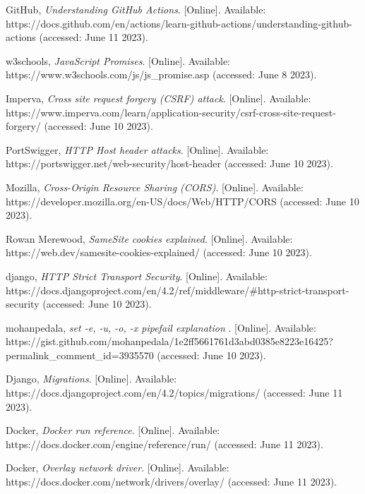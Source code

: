 \begin{referenceslist}
	\itemi GitHub, \emph{Understanding GitHub Actions}. [Online]. Available: \\
	https://docs.github.com/en/actions/learn-github-actions/understanding-github-actions  (accessed: June 11 2023).
	
	\itemj w3schools, \emph{JavaScript Promises}. [Online]. Available: \\ 
	https://www.w3schools.com/js/js\_promise.asp (accessed: June 8 2023).
	
	\itemk Imperva, \emph{Cross site request forgery (CSRF) attack}. [Online]. Available: \\
	https://www.imperva.com/learn/application-security/csrf-cross-site-request-forgery/ (accessed: June 10 2023).
	
	\iteml PortSwigger, \emph{HTTP Host header attacks}. [Online]. Available: \\
	https://portswigger.net/web-security/host-header (accessed: June 10 2023).
	
	\itemm Mozilla, \emph{Cross-Origin Resource Sharing (CORS)}. [Online]. Available: \\
	https://developer.mozilla.org/en-US/docs/Web/HTTP/CORS (accessed: June 10 2023).
	
	\itemn Rowan Merewood, \emph{SameSite cookies explained}. [Online]. Available: \\
	https://web.dev/samesite-cookies-explained/ (accessed: June 10 2023).
	
	\itemo django, \emph{HTTP Strict Transport Security}. [Online]. Available: \\
	https://docs.djangoproject.com/en/4.2/ref/middleware/\#http-strict-transport-security (accessed: June 10 2023).
	
	\itemp mohanpedala, \emph{set -e, -u, -o, -x pipefail explanation }. [Online]. Available: \\
	https://gist.github.com/mohanpedala/1e2ff5661761d3abd0385e8223e16425? \\ permalink\_comment\_id=3935570 (accessed: June 10 2023).
	
	\itemq Django, \emph{Migrations}. [Online]. Available: \\
	https://docs.djangoproject.com/en/4.2/topics/migrations/  (accessed: June 11 2023).
	
	\itemr Docker, \emph{Docker run reference}. [Online]. Available: \\
	https://docs.docker.com/engine/reference/run/  (accessed: June 11 2023).
	
	\items Docker, \emph{Overlay network driver}. [Online]. Available: \\
	https://docs.docker.com/network/drivers/overlay/  (accessed: June 11 2023).
	

\end{referenceslist}
